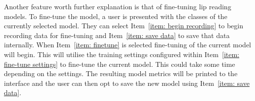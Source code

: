 Another feature worth further explanation is that of \gls{fine-tuning} lip reading models. To fine-tune the model, a user is presented with the classes of the currently selected model. They can select Item~\ref{item: begin recording} to begin recording data for \gls{fine-tuning} and Item~\ref{item: save data} to save that data internally. When Item~\ref{item: finetune} is selected \gls{fine-tuning} of the current model will begin. This will utilise the training settings configured within Item~\ref{item: fine-tune settings} to fine-tune the current model. This could take some time depending on the settings. The resulting model metrics will be printed to the interface and the user can then opt to save the new model using Item~\ref{item: save data}.